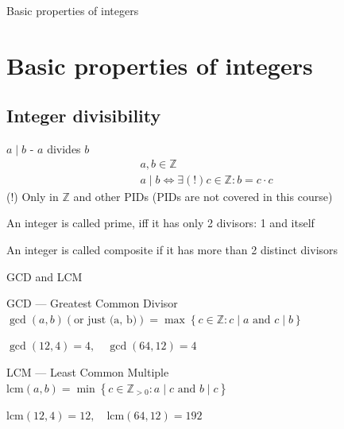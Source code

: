 \documentclass{beamer}
\begin{document}
\begin{frame}{Basic properties of integers}
    \section{Basic properties of integers}
    \subsection{Integer divisibility}
    \begin{definition}
        $a \mid b$ - $a$ divides $b$
        \begin{eqnarray*}
                & a, b \in \mathbb{Z} & \\
                & a \mid b \iff \exists(!) c \in \mathbb{Z} : b = c \cdot c
        \end{eqnarray*}
        (!) Only in $\mathbb{Z}$ and other PIDs (PIDs are not covered in this 
            course) 
    \end{definition}
    \begin{definition}
        An integer is called prime, iff it has only 2 divisors: 1 and itself
    \end{definition}
    \begin{definition}
        An integer is called composite if it has more than 2 distinct divisors
    \end{definition}
\end{frame}

\begin{frame}{GCD and LCM}
    \begin{definition}
        GCD --- Greatest Common Divisor \\
        $\gcd(a, b) (\text{or just (a, b)})= \max \left\{ c \in \mathbb{Z} : c \mid a \text{ and } c \mid b \right\}$
    \end{definition}
    \begin{example}
        $ \gcd(12, 4) = 4, \quad \gcd(64, 12) = 4 $ 
    \end{example}

    \begin{definition}
        LCM --- Least Common Multiple \\
        $\text{lcm}(a, b) = \min \left\{ c \in \mathbb{Z}_{> 0} : a \mid c \text{ and } b \mid c \right\}$
    \end{definition}
    \begin{example}
        $ \text{lcm}(12, 4) = 12, \quad \text{lcm}(64, 12) = 192 $
    \end{example}

\end{frame}
\end{document}
